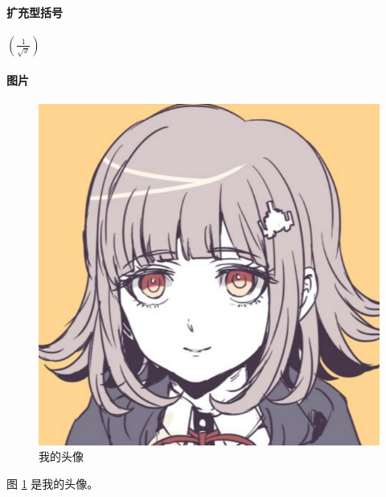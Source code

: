 \documentclass{article}
\begin{document}
        \paragraph{扩充型括号}
        $\left(\frac{1}{\sqrt{x}}\right)$
        \paragraph{图片}
        \begin{figure}
            \includegraphics[width=\linewidth]{myavatar.png}
            \caption{我的头像}
            \label{fig:myava1}
        \end{figure}
        图 \ref{fig:myava1} 是我的头像。
\end{document}
